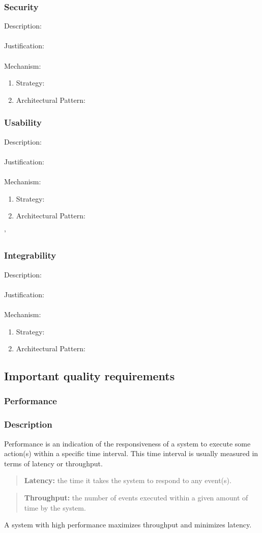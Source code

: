 \documentclass[a4paper,12pt,titlepage]{article}
\begin{document}
\subsubsection{Security}%
	Description: \\\\
	Justification: \\\\
	Mechanism:
	\begin{enumerate}
		\item Strategy: 
		\item Architectural Pattern:
	\end{enumerate}
\newpage
\subsubsection{Usability}%
	Description: \\\\
	Justification: \\\\
	Mechanism:
	\begin{enumerate}
		\item Strategy: 
		\item Architectural Pattern:
	\end{enumerate}'
\newpage
\subsubsection{Integrability}%
	Description: \\\\
	Justification: \\\\
	Mechanism:
	\begin{enumerate}
		\item Strategy: 
		\item Architectural Pattern:
	\end{enumerate}
\newpage
\subsection{Important quality requirements}
\subsubsection{Performance}%
	\subsubsection*{Description}
	Performance is an indication of the responsiveness of a system to execute some action(s) within a specific time interval. This time interval is usually measured in terms of latency or throughput. 
	\begin{quote}
		\textbf{Latency:} the time it takes the system to respond to any event(s).
	\end{quote} 
	\begin{quote}
		\textbf{Throughput:} the number of events executed within a given amount of time by the system.
	\end{quote} 
	A system with high performance maximizes throughput and minimizes latency.
\end{document}
